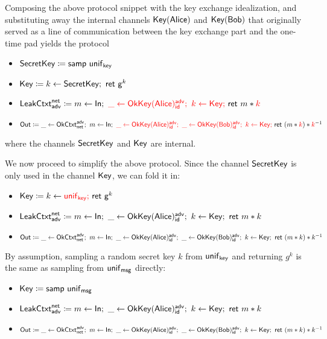 Composing the above protocol snippet with the key exchange idealization, and substituting away the internal channels $\mathsf{Key}(\mathsf{Alice})$ and $\mathsf{Key}(\mathsf{Bob})$ that originally served as a line of communication between the key exchange part and the one-time pad yields the protocol
\begin{itemize}
\item $\mathsf{SecretKey} \coloneqq \mathsf{samp} \ \mathsf{unif}_{\mathsf{key}}$
\item $\mathsf{Key} \coloneqq k \leftarrow \mathsf{SecretKey}; \ \mathsf{ret} \ \mathsf{g}^k$
\item $\LeakCtxt^\net_\adv \coloneqq m \leftarrow \In; \ {\color{red} \_ \leftarrow \OkKey(\Alice)^\adv_\id; \ k \leftarrow \Key; \ } \ret{m * {\color{red} k}}$
\item $\mathsf{Out} \coloneqq \_ \leftarrow \mathsf{OkCtxt}^{\mathsf{adv}}_{\mathsf{net}}; \ m \leftarrow \mathsf{In}; \ {\color{red} \_ \leftarrow \mathsf{OkKey}(\mathsf{Alice})^{\mathsf{adv}}_{\mathsf{id}}; \ \_ \leftarrow \mathsf{OkKey}(\mathsf{Bob})^{\mathsf{adv}}_{\mathsf{id}}; \ k \leftarrow \mathsf{Key}; \ } \mathsf{ret} \ (m * {\color{red} k}) * {\color{red} k}^{-1}$
\end{itemize}
where the channels $\mathsf{SecretKey}$ and $\mathsf{Key}$ are internal.

We now proceed to simplify the above protocol. Since the channel $\mathsf{SecretKey}$ is only used in the channel $\mathsf{Key}$, we can fold it in:

\begin{itemize}
\item $\mathsf{Key} \coloneqq k \leftarrow {\color{red} \mathsf{unif}_{\mathsf{key}}; \ } \mathsf{ret} \ \mathsf{g}^k$
\item $\mathsf{LeakCtxt}^{\mathsf{net}}_{\mathsf{adv}} \coloneqq m \leftarrow \mathsf{In}; \ \_ \leftarrow \mathsf{OkKey}(\mathsf{Alice})^{\mathsf{adv}}_{\mathsf{id}}; \ k \leftarrow \mathsf{Key}; \ \mathsf{ret} \ m * k$
\item $\mathsf{Out} \coloneqq \_ \leftarrow \mathsf{OkCtxt}^{\mathsf{adv}}_{\mathsf{net}}; \ m \leftarrow \mathsf{In}; \ \_ \leftarrow \mathsf{OkKey}(\mathsf{Alice})^{\mathsf{adv}}_{\mathsf{id}}; \ \_ \leftarrow \mathsf{OkKey}(\mathsf{Bob})^{\mathsf{adv}}_{\mathsf{id}}; \ k \leftarrow \mathsf{Key}; \ \mathsf{ret} \ (m * k) * k^{-1}$
\end{itemize}

\noindent By assumption, sampling a random secret key $k$ from $\mathsf{unif}_{\mathsf{key}}$ and returning $g^k$ is the same as sampling from $\mathsf{unif}_{\mathsf{msg}}$ directly:

\begin{itemize}
\item {\color{red} $\mathsf{Key} \coloneqq \mathsf{samp} \ \mathsf{unif}_{\mathsf{msg}}$}
\item $\mathsf{LeakCtxt}^{\mathsf{net}}_{\mathsf{adv}} \coloneqq m \leftarrow \mathsf{In}; \ \_ \leftarrow \mathsf{OkKey}(\mathsf{Alice})^{\mathsf{adv}}_{\mathsf{id}}; \ k \leftarrow \mathsf{Key}; \ \mathsf{ret} \ m * k$
\item $\mathsf{Out} \coloneqq \_ \leftarrow \mathsf{OkCtxt}^{\mathsf{adv}}_{\mathsf{net}}; \ m \leftarrow \mathsf{In}; \ \_ \leftarrow \mathsf{OkKey}(\mathsf{Alice})^{\mathsf{adv}}_{\mathsf{id}}; \ \_ \leftarrow \mathsf{OkKey}(\mathsf{Bob})^{\mathsf{adv}}_{\mathsf{id}}; \ k \leftarrow \mathsf{Key}; \ \mathsf{ret} \ (m * k) * k^{-1}$
\end{itemize}

